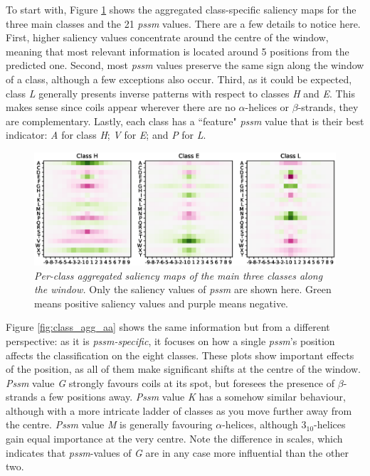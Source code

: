 		To start with, Figure \ref{fig:class_agg_class} shows the aggregated class-specific saliency maps for the three main classes and the 21 \textit{pssm} values. There are a few details to notice here. First, higher saliency values concentrate around the centre of the window, meaning that most relevant information is located around 5 positions from the predicted one. Second, most \textit{pssm} values preserve the same sign along the window of a class, although a few exceptions also occur. Third, as it could be expected, class \textit{L} generally presents inverse patterns with respect to classes \textit{H} and \textit{E}. This makes sense since coils appear wherever there are no $\alpha$-helices or $\beta$-strands, they are complementary. Lastly, each class has a ``feature" \textit{pssm} value that is their best indicator: \textit{A} for class \textit{H}; \textit{V} for \textit{E}; and \textit{P} for \textit{L}.
		
		\begin{figure}
			\centering
			\includegraphics[width=1\linewidth]{Figures/class_agg_class}
			\caption{\textit{Per-class aggregated saliency maps of the main three classes along the window.} Only the saliency values of \textit{pssm} are shown here. Green means positive saliency values and purple means negative.}
			\label{fig:class_agg_class}
		\end{figure}
		
		Figure \ref{fig:class_agg_aa} shows the same information but from a different perspective: as it is \textit{pssm-specific}, it focuses on how a single \textit{pssm}'s position affects the classification on the eight classes. These plots show important effects of the position, as all of them make significant shifts at the centre of the window. \textit{Pssm} value \textit{G} strongly favours coils at its spot, but foresees the presence of $\beta$-strands a few positions away. \textit{Pssm} value \textit{K} has a somehow similar behaviour, although with a more intricate ladder of classes as you move further away from the centre. \textit{Pssm} value \textit{M} is generally favouring $\alpha$-helices, although $3_{10}$-helices gain equal importance at the very centre. Note the difference in scales, which indicates that \textit{pssm}-values of \textit{G} are in any case more influential than the other two.
		
